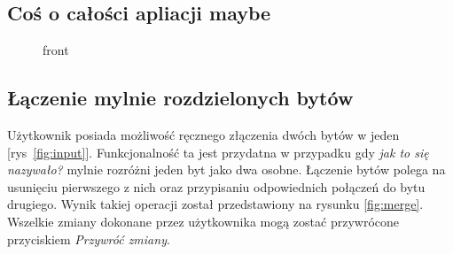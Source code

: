 \documentclass[12pt,a4paper]{article} %
\begin{document}
    
    \subsection{Coś o całości apliacji maybe}
    
    
    \begin{figure}[h!]
     \centering
     \caption{front}
     \label{apka}
     \end{figure}
     
    \subsection{Łączenie mylnie rozdzielonych bytów}
    Użytkownik posiada możliwość ręcznego złączenia dwóch bytów w jeden [rys~\ref{fig:input}]. Funkcjonalność ta jest przydatna w przypadku gdy \textit{jak to się nazywało?} mylnie rozróżni jeden byt jako dwa osobne. Łączenie bytów polega na usunięciu pierwszego z nich oraz przypisaniu odpowiednich połączeń do bytu drugiego. Wynik takiej operacji został przedstawiony na rysunku \ref{fig:merge}. Wszelkie zmiany dokonane przez użytkownika mogą zostać przywrócone przyciskiem \textit{Przywróć zmiany}.
    
\end{document}
